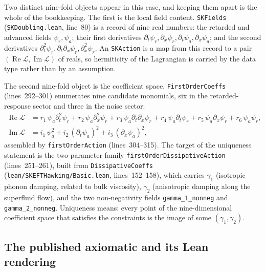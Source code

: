 \documentclass[11pt]{article}
\begin{document}
Two distinct nine-fold objects appear in this case, and keeping them
apart is the whole of the bookkeeping. The first is the local field
content. \texttt{SKFields} (\texttt{SKDoubling.lean}, line~80) is a
record of nine real numbers: the retarded and advanced fields
$\psi_r, \psi_a$; their first derivatives
$\partial_t\psi_r, \partial_x\psi_r, \partial_t\psi_a, \partial_x\psi_a$;
and the second derivatives
$\partial_t^2\psi_r, \partial_t\partial_x\psi_r, \partial_x^2\psi_r$.
An \texttt{SKAction} is a map from this record to a pair
$(\operatorname{Re}\mathcal{L}, \operatorname{Im}\mathcal{L})$ of reals,
so hermiticity of the Lagrangian is carried by the data type rather
than by an assumption.

The second nine-fold object is the coefficient space.
\texttt{FirstOrderCoeffs} (lines~292--301) enumerates nine candidate
monomials, six in the retarded-response sector and three in the noise
sector:
%
\begin{align*}
\operatorname{Re}\mathcal{L} &=
  r_1\,\psi_a\partial_t^2\psi_r
+ r_2\,\psi_a\partial_x^2\psi_r
+ r_3\,\psi_a\partial_t\partial_x\psi_r
+ r_4\,\psi_a\partial_t\psi_r
+ r_5\,\psi_a\partial_x\psi_r
+ r_6\,\psi_a\psi_r , \\
\operatorname{Im}\mathcal{L} &=
  i_1\,\psi_a^2
+ i_2\,(\partial_t\psi_a)^2
+ i_3\,(\partial_x\psi_a)^2 ,
\end{align*}
%
assembled by \texttt{firstOrderAction} (lines~304--315). The target of
the uniqueness statement is the two-parameter family
\texttt{firstOrderDissipativeAction} (lines~251--261), built from
\texttt{DissipativeCoeffs} (\texttt{lean/SKEFTHawking/Basic.lean},
lines~152--158), which carries $\gamma_1$ (isotropic phonon damping,
related to bulk viscosity), $\gamma_2$ (anisotropic damping along the
superfluid flow), and the two non-negativity fields
\texttt{gamma\_1\_nonneg} and \texttt{gamma\_2\_nonneg}. Uniqueness
means: every point of the nine-dimensional coefficient space that
satisfies the constraints is the image of some $(\gamma_1,\gamma_2)$.

\subsection{The published axiomatic and its Lean rendering}
\end{document}
